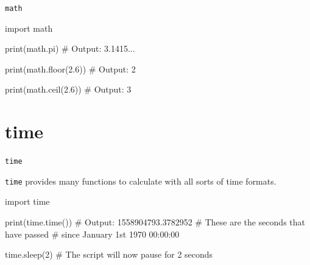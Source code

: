 \begin{frame}[fragile]{\texttt{math}}

    \begin{pythoncode}

import math

print(math.pi)
# Output: 3.1415...

print(math.floor(2.6))
# Output: 2

print(math.ceil(2.6))
# Output: 3

    \end{pythoncode}


\end{frame}


\section{time}

\begin{frame}[plain]
    \sectionpage
\end{frame}

\begin{frame}[fragile]{\texttt{time}}

    \texttt{time} provides many functions to calculate with all sorts of time formats.

    \begin{pythoncode}

import time

print(time.time())
# Output: 1558904793.3782952
# These are the seconds that have passed 
# since January 1st 1970 00:00:00

time.sleep(2)
# The script will now pause for 2 seconds


    \end{pythoncode}


\end{frame}


